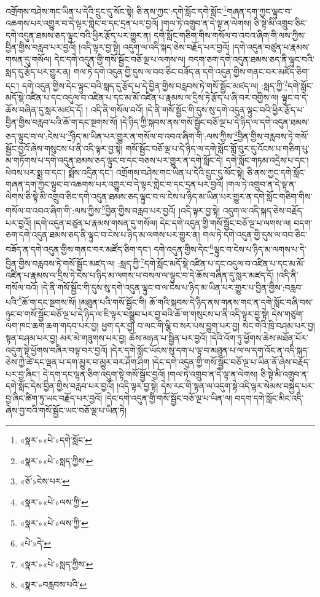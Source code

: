 འགྲོགས་བཤེས་གང་ཡིན་པ་དེའི་དྲུང་དུ་སོང་སྟེ། ཅི་ནས་ཀྱང་:དགེ་སློང་དགེ་སློང་\footnote{«སྣར་»«པེ་»དགེ་སློང་}གཞན་དག་ཀྱང་ལྟུང་བ་འཆགས་པར་འགྱུར་བ་དེ་ལྟར་གླེང་བ་དང་དྲན་པར་བྱའོ། །གལ་ཏེ་འགྲུབ་ན་དེ་ལྟ་ན་ལེགས། ཅི་སྟེ་མི་འགྲུབ་ཅིང་དགེ་འདུན་ཐམས་ཅད་ལྟུང་བའི་ཕྱིར་རྩོད་པར་གྱུར་ན། དགེ་སློང་གཅིག་གིས་གསོལ་བ་འབའ་ཞིག་གི་ལས་ཀྱིས་བྱིན་གྱིས་བརླབ་པར་བྱའོ། །འདི་ལྟར་བྱ་སྟེ། འདུག་ལ་འདི་སྐད་ཅེས་བརྗོད་པར་བྱའོ། །དགེ་འདུན་བཙུན་པ་རྣམས་གསན་དུ་གསོལ། དེང་དགེ་འདུན་གྱི་གསོ་སྦྱོང་བཅོ་ལྔ་པ་ལགས་ལ། བདག་ཅག་དགེ་འདུན་ཐམས་ཅད་ནི་ལྟུང་བའི་སླད་དུ་རྩོད་པར་གྱུར་ན། གལ་ཏེ་དགེ་འདུན་གྱི་དུས་ལ་བབ་ཅིང་བཟོད་ན་དགེ་འདུན་གྱིས་གནང་བར་མཛོད་ཅིག་དང་། དགེ་འདུན་གྱིས་དེང་ལྟུང་བའི་སླད་དུ་རྩོད་པ་དེ་བྱིན་གྱིས་བརླབས་ཏེ་གསོ་སྦྱོང་མཛད་ལ། :སླད་ཀྱི་\footnote{«སྣར་»«པེ་»སླད་ཀྱིས་}དགེ་སློང་མདོ་སྡེ་འཛིན་པ་དང་འདུལ་བ་འཛིན་པ་དང་མ་མོ་འཛིན་པ་རྣམས་ལ་དྲིས་ཏེ་རྩོད་པ་ཞི་བར་བགྱིས་ལ། ལྟུང་བ་དེ་ཆོས་བཞིན་དུ་སླར་མཛད་དོ། །
འདི་ནི་གསོལ་བའོ། །དེ་ནི་གསོ་སྦྱོང་གི་དུས་སུ་དགེ་འདུན་ལྟུང་བའི་ཕྱིར་རྩོད་པ་བྱིན་གྱིས་བརླབ་པའི་ཆོ་ག་དང་སྔགས་སོ། །དེ་ཉིད་ཀྱི་སྐབས་ནས་གསོ་སྦྱོང་བཅོ་ལྔ་པ་དེ་ཉིད་ལ་དགེ་འདུན་ཐམས་ཅད་ལྟུང་བ་ལ་:ངེས་པ་\footnote{«ཅོ་»ངེས་པར་}ཉིད་མ་ཡིན་པར་གྱུར་ན་གསོལ་བ་འབའ་ཞིག་གི་:ལས་ཀྱིས་\footnote{«སྣར་»«པེ་»ལས་ཀྱི་}བྱིན་གྱིས་བརླབས་ཏེ་གསོ་སྦྱོང་བྱའོ་ཞེས་གསུངས་པ་ནི་འདི་ལྟར་བྱ་སྟེ། གསོ་སྦྱོང་བཅོ་ལྔ་པ་དེ་ཉིད་ལ་དགེ་སློང་གློ་བུར་དུ་འོངས་པ་གཅིག་པུ་མ་གཏོགས་པ་དགེ་འདུན་ཐམས་ཅད་ལྟུང་བ་དང་བཅས་པར་གྱུར་ན་དགེ་སློང་དེ། དགེ་སློང་གཏམ་འདྲེས་པ་དང་། ཕེབས་པར་སྨྲ་བ་དང་། སྨོས་འདྲིན་དང་། འགྲོགས་བཤེས་གང་ཡིན་པ་དེའི་དྲུང་དུ་སོང་སྟེ། ཅི་ནས་ཀྱང་དགེ་སློང་གཞན་དག་ཀྱང་ལྟུང་བ་འཆགས་པར་འགྱུར་བ་དེ་ལྟར་གླེང་བ་དང་དྲན་པར་བྱའོ། །གལ་ཏེ་འགྲུབ་ན་དེ་ལྟ་ན་ལེགས་ཅི་སྟེ་མི་འགྲུབ་ཅིང་དགེ་འདུན་ཐམས་ཅད་ལྟུང་བ་ལ་ངེས་པ་ཉིད་མ་ཡིན་པར་གྱུར་ན་དགེ་སློང་གཅིག་གིས་གསོལ་བ་འབའ་ཞིག་གི་:ལས་ཀྱིས་\footnote{«སྣར་»«པེ་»ལས་ཀྱི་}བྱིན་གྱིས་བརླབ་པར་བྱའོ། །འདི་ལྟར་བྱ་སྟེ། འདུག་ལ་འདི་སྐད་ཅེས་བརྗོད་པར་བྱའོ། །དགེ་འདུན་བཙུན་པ་རྣམས་གསན་དུ་གསོལ། དེང་དགེ་འདུན་གྱི་གསོ་སྦྱོང་བཅོ་ལྔ་པ་ལགས་ལ། བདག་ཅག་དགེ་འདུན་ཐམས་ཅད་ནི་ལྟུང་བ་ངེས་པ་ཉིད་མ་ལགས་པར་གྱུར་ན། གལ་ཏེ་དགེ་འདུན་གྱི་དུས་ལ་བབ་ཅིང་བཟོད་ན་དགེ་འདུན་གྱིས་གནང་བར་མཛོད་ཅིག་དང་། དགེ་འདུན་གྱིས་དེང་\footnote{«པེ་»དེ་}ལྟུང་བ་ངེས་པ་ཉིད་མ་ལགས་པ་དེ་བྱིན་གྱིས་བརླབས་ཏེ་གསོ་སྦྱོང་མཛད་ལ། :སླད་ཀྱི་\footnote{«སྣར་»«པེ་»སླད་ཀྱིས་}དགེ་སློང་མདོ་སྡེ་འཛིན་པ་དང་འདུལ་བ་འཛིན་པ་དང་མ་མོ་འཛིན་པ་རྣམས་ལ་དྲིས་ཏེ་ངེས་པ་ཉིད་མ་ལགས་པ་བསལ་ལ་ལྟུང་བ་དེ་ཆོས་བཞིན་དུ་སླར་མཛད་དོ། །འདི་ནི་གསོལ་བའོ། །དེ་ནི་གསོ་སྦྱོང་གི་དུས་སུ་དགེ་འདུན་ལྟུང་བ་ལ་ངེས་པ་ཉིད་མ་ཡིན་པར་གྱུར་པ་བྱིན་གྱིས་:བརླབ་པའི་\footnote{«སྣར་»བརླབས་པའི་}ཆོ་ག་དང་སྔགས་སོ། །མཐུན་པའི་གསོ་སྦྱོང་གི། ཆོ་གའི་སྐབས་དེ་ཉིད་ནས་གནས་གང་ན་དགེ་སློང་བཞི་བས་ཉུང་བ་གསོ་སྦྱོང་བཅོ་ལྔ་པ་དེ་ཉིད་ལ་ཇི་ལྟར་བསྒྲུབ་པར་བྱ་བའི་ཆོ་ག་གསུངས་པ་ནི་འདི་ལྟར་བྱ་སྟེ། དེས་གཙུག་ལག་ཁང་ཆག་ཆག་གདབ་པར་བྱ། ཕྱག་དར་བྱ། བ་ལང་གི་ལྕི་བ་སར་པས་བྱུག་པར་བྱ། སེང་གེའི་ཁྲི་བཤམ་པར་བྱ། སྟན་བཤམ་པར་བྱ། མར་མེ་གཟུགས་པར་བྱ། ཆོས་མཉན་པ་སྦྱིན་པར་བྱའོ། །དེའི་འོག་ཏུ་ཕྱོགས་ཆེས་མཐོན་པོར་འདུག་སྟེ་ཕྱོགས་བཞིར་བལྟ་བར་བྱའོ། །དེར་དགེ་སློང་ཡོངས་སུ་དག་པ་ལྟ་བ་མཐུན་པ་ལ་ལ་དག་འོང་ན་འདི་སྐད་ཅེས་ཀྱེ་ཚེ་དང་ལྡན་པ་དག་མྱུར་བ་མྱུར་བར་ཤོག་ཤིག །དེང་དགེ་འདུན་གྱི་གསོ་སྦྱོང་བཅོ་ལྔ་པ་ཡིན་ནོ་ཞེས་བརྗོད་པར་བྱ་ཞིང་། དེ་དག་དང་ལྷན་ཅིག་འདུག་སྟེ་གསོ་སྦྱོང་བྱའོ། །གལ་ཏེ་འགྲུབ་ན་དེ་ལྟ་ན་ལེགས། ཅི་སྟེ་མི་འགྲུབ་ན་དགེ་སློང་དེས་བྱིན་གྱིས་བརླབ་པར་བྱའོ། །འདི་ལྟར་བྱ་སྟེ། དེས་རང་གི་སྟན་ལ་འདུག་སྟེ་འདི་ལྟར་སེམས་བསྐྱེད་པར་བྱ་ཞིང་ཚིག་ཏུ་ཡང་བརྗོད་པར་བྱའོ། །དེང་དགེ་འདུན་གྱི་གསོ་སྦྱོང་བཅོ་ལྔ་པ་ཡིན་ལ། བདག་དགེ་སློང་མིང་འདི་ཞེས་བྱ་བའི་གསོ་སྦྱོང་ཡང་བཅོ་ལྔ་པ་ཡིན་ཏེ། 